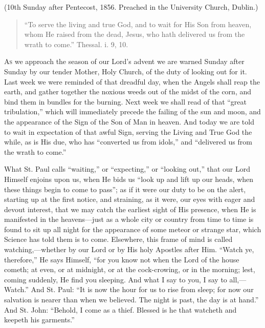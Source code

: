 (10th Sunday after Pentecost, 1856. Preached in the
University Church, Dublin.)


\begin{quote}

``To serve the living and true God, and to
wait for His Son from heaven, whom He raised from the
dead, Jesus, who hath delivered us from the wrath to
come.'' Thessal. i. 9, 10.

\end{quote}

A\textsc{s} we approach the season of our Lord's advent we are
warned Sunday after Sunday by our tender Mother, Holy
Church, of the duty of looking out for it. Last week we
were reminded of that dreadful day, when the Angels shall
reap the earth, and gather together the noxious weeds out
of the midst of the corn, and bind them in bundles for
the burning. Next week we shall read of that ``great
tribulation,'' which will immediately precede the
failing of the sun and moon, and the appearance of the
Sign of the Son of Man in heaven. And today we are told
to wait in expectation of that awful Sign, serving the
Living and True God the while, as is His due, who has
``converted us from idols,'' and ``delivered us
from the wrath to come.''

What St. Paul calls ``waiting,'' or
``expecting,'' or ``looking out,'' that
our Lord Himself enjoins upon us, when He bids us
``look up and lift up our heads, when these things
begin to come to pass''; as if it were our duty to be
on the alert, starting up at the first notice, and
straining, as it were, our eyes with eager and devout
interest, that we may catch the earliest sight of His
presence, when He is manifested in the heavens—just
as a whole city or country from time to time is found to
sit up all night for the appearance of some meteor or
strange star, which Science has told them is to come.
Elsewhere, this frame of mind is called
watching,—whether by our Lord or by His holy
Apostles after Him. ``Watch ye, therefore,'' He
says Himself, ``for you know not when the Lord of the
house cometh; at even, or at midnight, or at the
cock-crowing, or in the morning; lest, coming suddenly,
He find you sleeping. And what I say to you, I say to
all,—Watch.'' And St. Paul: ``It is now the
hour for us to rise from sleep; for now our salvation is
nearer than when we believed. The night is past, the day
is at hand.'' And St. John: ``Behold, I come as a
thief. Blessed is he that watcheth and keepeth his
garments.''

